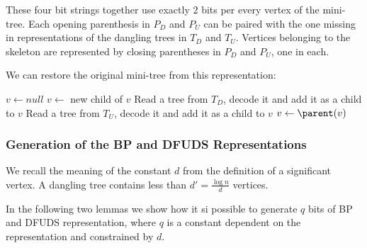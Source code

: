 These four bit strings together use exactly $2$ bits per every vertex of the mini-tree.
Each opening parenthesis in $P_D$ and $P_U$ can be paired with the one missing in representations of the dangling trees in $T_D$ and $T_U$.
Vertices belonging to the skeleton are represented by closing parentheses in $P_D$ and $P_U$, one in each.

We can restore the original mini-tree from this representation:
\begin{algorithm}
\begin{algorithmic}
\Function{\restore}{}
	\State $v \gets null$
		\State $v \gets$ new child of $v$
			\State Read a tree from $T_D$, decode it and add it as a child to $v$
		\EndWhile
	\EndWhile
			\State Read a tree from $T_U$, decode it and add it as a child to $v$
		\EndWhile
		\State $v \gets \parent(v)$
	\EndWhile
\EndFunction
\end{algorithmic}
\end{algorithm}

\subsubsection{Generation of the BP and DFUDS Representations}

We recall the meaning of the constant $d$ from the definition of a significant vertex.
A dangling tree contains less than $d' = \frac{\log n}{d}$ vertices.

In the following two lemmas we show how it si possible to generate $q$ bits of BP and DFUDS representation, where $q$ is a constant dependent on the representation and constrained by $d$.


